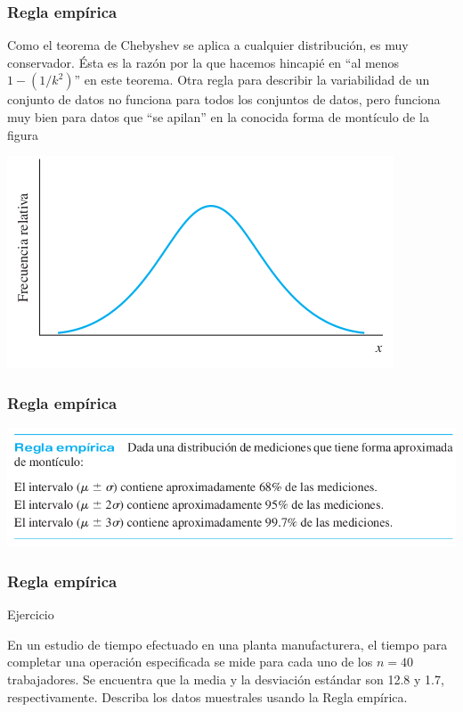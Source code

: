 \documentclass[spanish]{beamer}
\begin{document}
\begin{frame}
\frametitle{Regla empírica}
Como el teorema de Chebyshev se aplica a cualquier distribución, es muy conservador. Ésta es la razón por la que hacemos hincapié en “al menos $1 - (1/k ^2)$” en este teorema. Otra regla para describir la variabilidad de un conjunto de datos no funciona para todos los conjuntos de datos, pero funciona muy bien para datos que “se apilan” en la conocida forma de montículo de la figura

\begin{center}
\includegraphics[scale=0.4]{im20}
\end{center}
\end{frame}
\begin{frame}
\frametitle{Regla empírica}
\begin{center}
\includegraphics[scale=0.4]{im21}
\end{center}


\end{frame}
\begin{frame}
\frametitle{Regla empírica}
Ejercicio 

En un estudio de tiempo efectuado en una planta manufacturera, el tiempo para completar una operación especificada se mide para cada uno de los $n= 40$ trabajadores. Se encuentra que la media y la desviación estándar son 12.8 y 1.7, respectivamente. Describa los datos muestrales usando la Regla empírica.


\end{frame}
\end{document}
